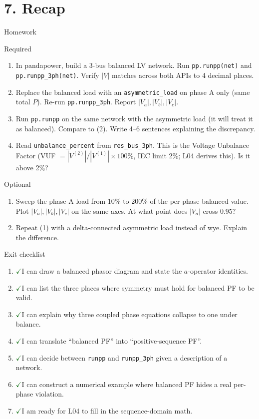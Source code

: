 \documentclass[aspectratio=169,10pt]{beamer}
\newcommand{\code}[1]{\texttt{#1}}
\newcommand{\checkitem}{\textcolor{darkgreen}{\Large$\checkmark$}\;}
\begin{document}
\section*{7. Recap}

\begin{frame}{Homework}
\begin{block}{Required}
\begin{enumerate}
  \item In pandapower, build a 3-bus balanced LV network. Run \code{pp.runpp(net)} and \code{pp.runpp\_3ph(net)}. Verify $|V|$ matches across both APIs to 4 decimal places.
  \item Replace the balanced load with an \code{asymmetric\_load} on phase A only (same total $P$). Re-run \code{pp.runpp\_3ph}. Report $|V_a|, |V_b|, |V_c|$.
  \item Run \code{pp.runpp} on the same network with the asymmetric load (it will treat it as balanced). Compare to (2). Write 4--6 sentences explaining the discrepancy.
  \item Read \code{unbalance\_percent} from \code{res\_bus\_3ph}. This is the Voltage Unbalance Factor (VUF $= |V^{(2)}|/|V^{(1)}| \times 100\%$, IEC limit 2\%; L04 derives this). Is it above 2\%?
\end{enumerate}
\end{block}
\begin{block}{Optional}
\begin{enumerate}
  \item Sweep the phase-A load from 10\% to 200\% of the per-phase balanced value. Plot $|V_a|, |V_b|, |V_c|$ on the same axes. At what point does $|V_a|$ cross 0.95?
  \item Repeat (1) with a delta-connected asymmetric load instead of wye. Explain the difference.
\end{enumerate}
\end{block}
\end{frame}

\begin{frame}{Exit checklist}
\begin{enumerate}
  \item \checkitem I can draw a balanced phasor diagram and state the $a$-operator identities.
  \item \checkitem I can list the three places where symmetry must hold for balanced PF to be valid.
  \item \checkitem I can explain why three coupled phase equations collapse to one under balance.
  \item \checkitem I can translate ``balanced PF'' into ``positive-sequence PF''.
  \item \checkitem I can decide between \code{runpp} and \code{runpp\_3ph} given a description of a network.
  \item \checkitem I can construct a numerical example where balanced PF hides a real per-phase violation.
  \item \checkitem I am ready for L04 to fill in the sequence-domain math.
\end{enumerate}
\end{frame}
\end{document}
